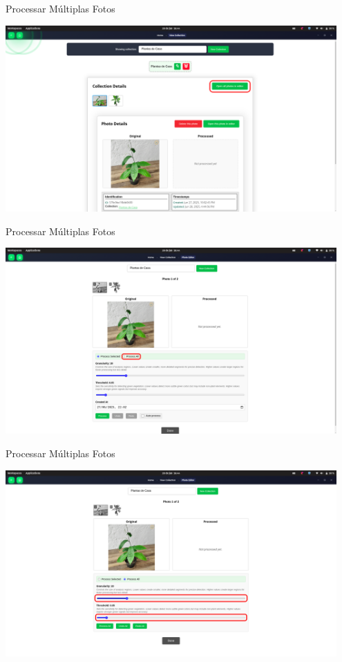 \documentclass[landscape, 12pt]{beamer}
\begin{document}
\begin{frame}{Processar Múltiplas Fotos}
    \begin{center}
        \includegraphics[width=0.95\textwidth]{../figures/screens/uc012/Screenshot from 2025-06-28 16-44-15.png}
    \end{center}
\end{frame}

\begin{frame}{Processar Múltiplas Fotos}
    \begin{center}
        \includegraphics[width=0.95\textwidth]{../figures/screens/uc012/Screenshot from 2025-06-28 16-44-28.png}
    \end{center}
\end{frame}

\begin{frame}{Processar Múltiplas Fotos}
    \begin{center}
        \includegraphics[width=0.95\textwidth]{../figures/screens/uc012/Screenshot from 2025-06-28 16-44-32.png}
    \end{center}
\end{frame}
\end{document}
